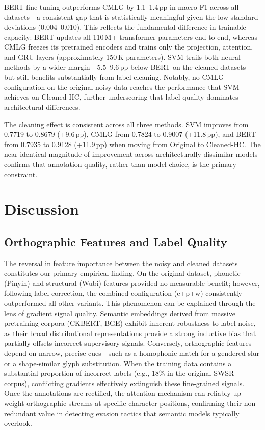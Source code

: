 ﻿\documentclass[12pt]{article}
\begin{document}
BERT fine-tuning outperforms CMLG by 1.1--1.4\,pp in macro F1 across all datasets---a consistent gap that is statistically meaningful given the low standard deviations (0.004--0.010). This reflects the fundamental difference in trainable capacity: BERT updates all 110\,M+ transformer parameters end-to-end, whereas CMLG freezes its pretrained encoders and trains only the projection, attention, and GRU layers (approximately 150\,K parameters). SVM trails both neural methods by a wider margin---5.5--9.6\,pp below BERT on the cleaned datasets---but still benefits substantially from label cleaning. Notably, no CMLG configuration on the original noisy data reaches the performance that SVM achieves on Cleaned-HC, further underscoring that label quality dominates architectural differences.

The cleaning effect is consistent across all three methods. SVM improves from 0.7719 to 0.8679 (+9.6\,pp), CMLG from 0.7824 to 0.9007 (+11.8\,pp), and BERT from 0.7935 to 0.9128 (+11.9\,pp) when moving from Original to Cleaned-HC. The near-identical magnitude of improvement across architecturally dissimilar models confirms that annotation quality, rather than model choice, is the primary constraint.

\section{Discussion}

\subsection{Orthographic Features and Label Quality}
The reversal in feature importance between the noisy and cleaned datasets constitutes our primary empirical finding. On the original dataset, phonetic (Pinyin) and structural (Wubi) features provided no measurable benefit; however, following label correction, the combined configuration (c+p+w) consistently outperformed all other variants. This phenomenon can be explained through the lens of gradient signal quality. Semantic embeddings derived from massive pretraining corpora (CKBERT, BGE) exhibit inherent robustness to label noise, as their broad distributional representations provide a strong inductive bias that partially offsets incorrect supervisory signals. Conversely, orthographic features depend on narrow, precise cues---such as a homophonic match for a gendered slur or a shape-similar glyph substitution. When the training data contains a substantial proportion of incorrect labels (e.g., 18\% in the original SWSR corpus), conflicting gradients effectively extinguish these fine-grained signals. Once the annotations are rectified, the attention mechanism can reliably up-weight orthographic streams at specific character positions, confirming their non-redundant value in detecting evasion tactics that semantic models typically overlook.
\end{document}
